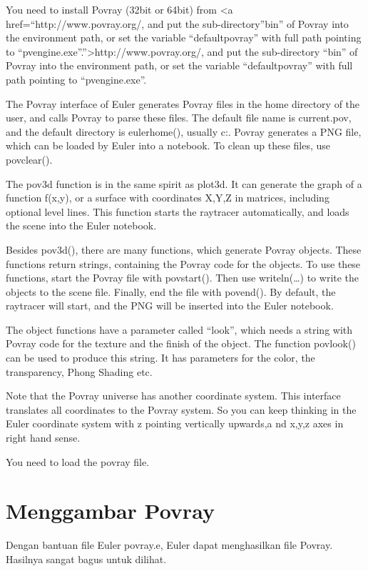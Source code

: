 \documentclass[
]{book}
\begin{document}
You need to install Povray (32bit or 64bit) from \textless a href=``http://www.povray.org/, and put the sub-directory''bin'' of Povray into the environment path, or set the variable ``defaultpovray'' with full path pointing to ``pvengine.exe''.''\textgreater http://www.povray.org/, and put the sub-directory ``bin'' of Povray into the environment path, or set the variable ``defaultpovray'' with full path pointing to ``pvengine.exe''.

The Povray interface of Euler generates Povray files in the home directory of the user, and calls Povray to parse these files. The default file name is current.pov, and the default directory is eulerhome(), usually c:\Users\Username\Euler. Povray generates a PNG file, which can be loaded by Euler into a notebook. To clean up these files, use povclear().

The pov3d function is in the same spirit as plot3d. It can generate the graph of a function f(x,y), or a surface with coordinates X,Y,Z in matrices, including optional level lines. This function starts the raytracer automatically, and loads the scene into the Euler notebook.

Besides pov3d(), there are many functions, which generate Povray objects. These functions return strings, containing the Povray code for the objects. To use these functions, start the Povray file with povstart(). Then use writeln(\ldots) to write the objects to the scene file. Finally, end the file with povend(). By default, the raytracer will start, and the PNG will be inserted into the Euler notebook.

The object functions have a parameter called ``look'', which needs a string with Povray code for the texture and the finish of the object. The function povlook() can be used to produce this string. It has parameters for the color, the transparency, Phong Shading etc.

Note that the Povray universe has another coordinate system. This interface translates all coordinates to the Povray system. So you can keep thinking in the Euler coordinate system with z pointing vertically upwards,a nd x,y,z axes in right hand sense.

You need to load the povray file.

\chapter{Menggambar Povray}\label{menggambar-povray-1}

Dengan bantuan file Euler povray.e, Euler dapat menghasilkan file Povray. Hasilnya sangat bagus untuk dilihat.
\end{document}
